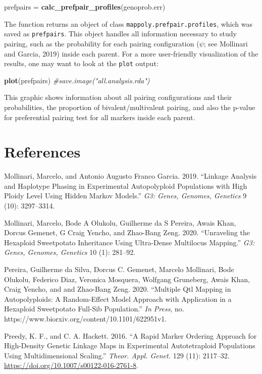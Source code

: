\documentclass[
]{article}
\newenvironment{Shaded}{}{}
\newcommand{\CommentTok}[1]{\textcolor[rgb]{0.38,0.63,0.69}{\textit{#1}}}
\newcommand{\KeywordTok}[1]{\textcolor[rgb]{0.00,0.44,0.13}{\textbf{#1}}}
\newcommand{\NormalTok}[1]{#1}
\newcommand{\StringTok}[1]{\textcolor[rgb]{0.25,0.44,0.63}{#1}}
\begin{document}
\begin{Shaded}
\begin{Highlighting}[]
\NormalTok{prefpairs =}\StringTok{ }\KeywordTok{calc_prefpair_profiles}\NormalTok{(genoprob.err)}
\end{Highlighting}
\end{Shaded}

The function returns an object of class
\texttt{mappoly.prefpair.profiles}, which was saved as
\texttt{prefpairs}. This object handles all information necessary to
study pairing, such as the probability for each pairing configuration
(\(\psi\); see Mollinari and Garcia, 2019) inside each parent. For a
more user-friendly visualization of the results, one may want to look at
the \texttt{plot} output:

\begin{Shaded}
\begin{Highlighting}[]
\KeywordTok{plot}\NormalTok{(prefpairs)}
\CommentTok{#save.image("all.analysis.rda")}
\end{Highlighting}
\end{Shaded}

This graphic shows information about all pairing configurations and
their probabilities, the proportion of bivalent/multivalent pairing, and
also the p-value for preferential pairing test for all markers inside
each parent.

\hypertarget{references}{%
\section*{References}\label{references}}

\hypertarget{refs}{}
\leavevmode\hypertarget{ref-Mollinari2019}{}%
Mollinari, Marcelo, and Antonio Augusto Franco Garcia. 2019. ``Linkage
Analysis and Haplotype Phasing in Experimental Autopolyploid Populations
with High Ploidy Level Using Hidden Markov Models.'' \emph{G3: Genes,
Genomes, Genetics} 9 (10): 3297--3314.

\leavevmode\hypertarget{ref-Mollinari2020}{}%
Mollinari, Marcelo, Bode A Olukolu, Guilherme da S Pereira, Awais Khan,
Dorcus Gemenet, G Craig Yencho, and Zhao-Bang Zeng. 2020. ``Unraveling
the Hexaploid Sweetpotato Inheritance Using Ultra-Dense Multilocus
Mapping.'' \emph{G3: Genes, Genomes, Genetics} 10 (1): 281--92.

\leavevmode\hypertarget{ref-Pereira2020}{}%
Pereira, Guilherme da Silva, Dorcus C. Gemenet, Marcelo Mollinari, Bode
Olukolu, Federico Diaz, Veronica Mosquera, Wolfgang Gruneberg, Awais
Khan, Craig Yencho, and and Zhao-Bang Zeng. 2020. ``Multiple Qtl Mapping
in Autopolyploids: A Random-Effect Model Approach with Application in a
Hexaploid Sweetpotato Full-Sib Population.'' \emph{In Press}, no.
https://www.biorxiv.org/content/10.1101/622951v1.

\leavevmode\hypertarget{ref-Preedy2016}{}%
Preedy, K. F., and C. A. Hackett. 2016. ``A Rapid Marker Ordering
Approach for High-Density Genetic Linkage Maps in Experimental
Autotetraploid Populations Using Multidimensional Scaling.''
\emph{Theor. Appl. Genet.} 129 (11): 2117--32.
\url{https://doi.org/10.1007/s00122-016-2761-8}.
\end{document}
